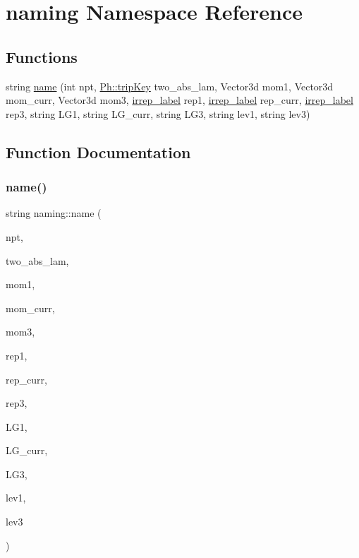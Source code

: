 \hypertarget{namespacenaming}{}\section{naming Namespace Reference}
\label{namespacenaming}
\subsection*{Functions}
\begin{DoxyCompactItemize}
\item 
string \mbox{\hyperlink{namespacenaming_a0be3b30603f24f1e39a06c9a0fbdca7e}{name}} (int npt, \mbox{\hyperlink{namespacePh_afdd5bf3d7b37625115089ea3048e0cbb}{Ph\+::trip\+Key}} two\+\_\+abs\+\_\+lam, Vector3d mom1, Vector3d mom\+\_\+curr, Vector3d mom3, \mbox{\hyperlink{structirrep__label}{irrep\+\_\+label}} rep1, \mbox{\hyperlink{structirrep__label}{irrep\+\_\+label}} rep\+\_\+curr, \mbox{\hyperlink{structirrep__label}{irrep\+\_\+label}} rep3, string L\+G1, string L\+G\+\_\+curr, string L\+G3, string lev1, string lev3)
\end{DoxyCompactItemize}


\subsection{Function Documentation}
\mbox{\label{namespacenaming_a0be3b30603f24f1e39a06c9a0fbdca7e}} 
\subsubsection{\texorpdfstring{name()}{name()}}
{\footnotesize\ttfamily string naming\+::name (\begin{DoxyParamCaption}\item[{int}]{npt,  }\item[{\mbox{\hyperlink{namespacePh_afdd5bf3d7b37625115089ea3048e0cbb}{Ph\+::trip\+Key}}}]{two\+\_\+abs\+\_\+lam,  }\item[{Vector3d}]{mom1,  }\item[{Vector3d}]{mom\+\_\+curr,  }\item[{Vector3d}]{mom3,  }\item[{\mbox{\hyperlink{structirrep__label}{irrep\+\_\+label}}}]{rep1,  }\item[{\mbox{\hyperlink{structirrep__label}{irrep\+\_\+label}}}]{rep\+\_\+curr,  }\item[{\mbox{\hyperlink{structirrep__label}{irrep\+\_\+label}}}]{rep3,  }\item[{string}]{L\+G1,  }\item[{string}]{L\+G\+\_\+curr,  }\item[{string}]{L\+G3,  }\item[{string}]{lev1,  }\item[{string}]{lev3 }\end{DoxyParamCaption})}

